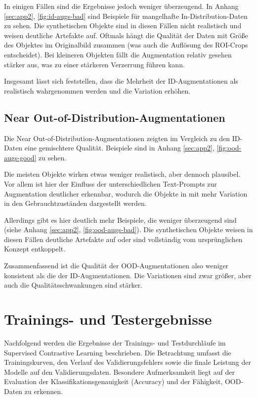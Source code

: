 In einigen Fällen sind die Ergebnisse jedoch weniger überzeugend. In Anhang \ref{sec:app2}, \autoref{fig:id-augs-bad} sind Beispiele für mangelhafte In-Distribution-Daten zu sehen. Die synthetischen Objekte sind in diesen Fällen nicht realistisch und weisen deutliche Artefakte auf. Oftmals hängt die Qualität der Daten mit Größe des Objektes im Originalbild zusammen (was auch die Auflösung des ROI-Crops entscheidet). Bei kleineren Objekten fällt die Augmentation relativ gesehen stärker aus, was zu einer stärkeren Verzerrung führen kann.

Insgesamt lässt sich feststellen, dass die Mehrheit der ID-Augmentationen als realistisch wahrgenommen werden und die Variation erhöhen.

\subsection{Near Out-of-Distribution-Augmentationen} \label{subsec:da-fusion-ood-results}

Die Near Out-of-Distribution-Augmentationen zeigten im Vergleich zu den ID-Daten eine gemischtere Qualität. Beispiele sind in Anhang \ref{sec:app2}, \autoref{fig:ood-augs-good} zu sehen.

Die meisten Objekte wirken etwas weniger realistisch, aber dennoch plausibel. Vor allem ist hier der Einfluss der unterschiedlichen Text-Prompts zur Augmentation deutlicher erkennbar, wodurch die Objekte in mit mehr Variation in den Gebrauchtzuständen dargestellt werden.

Allerdings gibt es hier deutlich mehr Beispiele, die weniger überzeugend sind (siehe Anhang \ref{sec:app2}, \autoref{fig:ood-augs-bad}). Die synthetischen Objekte weisen in diesen Fällen deutliche Artefakte auf oder sind vollständig vom ursprünglichen Konzept entkoppelt.

Zusammenfassend ist die Qualität der OOD-Augmentationen also weniger konsistent als die der ID-Augmentationen. Die Variationen sind zwar größer, aber auch die Qualitätsschwankungen sind stärker.

\section{Trainings- und Testergebnisse} \label{sec:supcon-results}

Nachfolgend werden die Ergebnisse der Trainings- und Testdurchläufe im Supervised Contrastive Learning beschrieben. Die Betrachtung umfasst die Trainingskurven, den Verlauf des Validierungsfehlers sowie die finale Leistung der Modelle auf den Validierungsdaten. Besondere Aufmerksamkeit liegt auf der Evaluation der Klassifikationsgenauigkeit (Accuracy) und der Fähigkeit, OOD-Daten zu erkennen.

